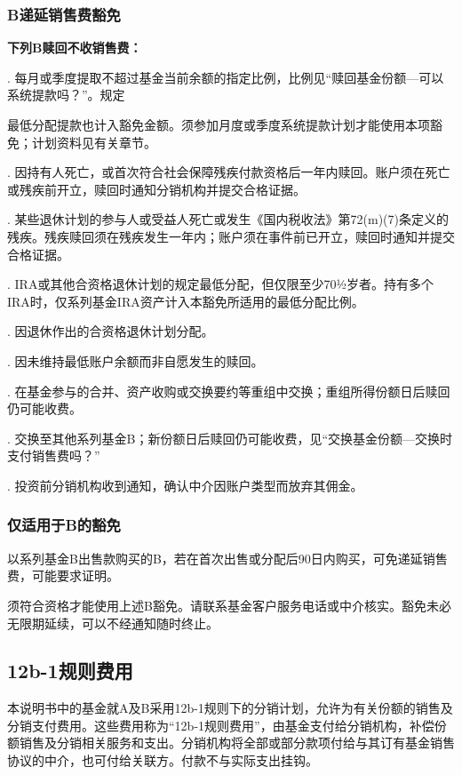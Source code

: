 \documentclass[UTF8,fontset=none,11pt,a4paper]{ctexart}
\begin{document}
\subsubsection*{B递延销售费豁免}
\textbf{下列B赎回不收销售费：}

. 每月或季度提取不超过基金当前余额的指定比例，比例见“赎回基金份额—可以系统提款吗？”。规定


最低分配提款也计入豁免金额。须参加月度或季度系统提款计划才能使用本项豁免；计划资料见\allowbreak\mbox{有关章节。}


. 因持有人死亡，或首次符合社会保障残疾付款资格后一年内赎回。账户须在死亡或残疾前开立，赎回时通知分销机构并提交\allowbreak\mbox{合格证据。}


. 某些退休计划的参与人或受益人死亡或发生《国内税收法》第72(m)(7)条定义的残疾。残疾赎回须在残疾发生一年内；账户须在事件前已开立，赎回时通知并提交\allowbreak\mbox{合格证据。}


. IRA或其他合资格退休计划的规定最低分配，但仅限至少70½岁者。持有多个IRA时，仅系列基金IRA资产计入本豁免所适用的最低\allowbreak\mbox{分配比例。}


. 因退休作出的合资格退休\allowbreak\mbox{计划分配。}


. 因未维持最低账户余额而非自愿发\allowbreak\mbox{生的赎回。}


. 在基金参与的合并、资产收购或交换要约等重组中交换；重组所得份额日后赎回仍\allowbreak\mbox{可能收费。}


. 交换至其他系列基金B；新份额日后赎回仍可能收费，见“交换基金份额—交换时支付\allowbreak\mbox{销售费吗？”}


. 投资前分销机构收到通知，确认中介因账户类型而放\allowbreak\mbox{弃其佣金。}



\par{}\label{originalpage17}
\subsubsection*{仅适用于B的豁免}
以系列基金B出售款购买的B，若在首次出售或分配后90日内购买，可免递延销售费，可能\allowbreak\mbox{要求证明。}

须符合资格才能使用上述B豁免。请联系基金客户服务电话或中介核实。豁免未必无限期延续，可以不经通知随\allowbreak\mbox{时终止。}

\subsection*{12b-1规则费用}\label{unitU649}
本说明书中的基金就A及B采用12b-1规则下的分销计划，允许为有关份额的销售及分销支付费用。这些费用称为“12b-1规则费用”，由基金支付给分销机构，补偿份额销售及分销相关服务和支出。分销机构将全部或部分款项付给与其订有基金销售协议的中介，也可付给关联方。付款不与实际\allowbreak\mbox{支出挂钩。}
\end{document}
